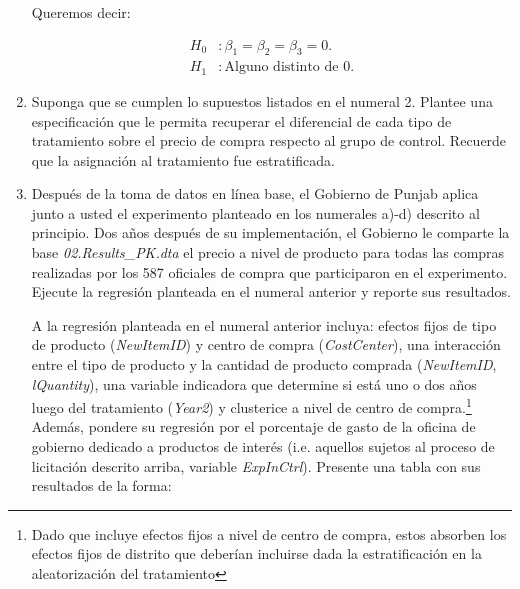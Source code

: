 \documentclass[a4paper, answers, addpoints, 11pt]{exam}
\begin{document}
\begin{enumerate}
\begin{mdframed}
Queremos decir:

\[
\begin{aligned}
H_0 &: \beta_1 = \beta_2 = \beta_3 = 0. \\
H_1 &: \text{Alguno distinto de } 0.
\end{aligned}
\]

        \end{mdframed}
    

   \item Suponga que se cumplen lo supuestos listados en el numeral 2. Plantee una especificación que le permita recuperar el diferencial de cada tipo de tratamiento sobre el precio de compra respecto al grupo de control. Recuerde que la asignación al tratamiento fue estratificada.


   \item Después de la toma de datos en línea base, el Gobierno de Punjab aplica junto a usted el experimento planteado en los numerales a)-d) descrito al principio. Dos años después de su implementación, el Gobierno le comparte la base \textit{02.Results\_PK.dta} el precio a nivel de producto para todas las compras realizadas por los 587 oficiales de compra que participaron en el experimento. Ejecute la regresión planteada en el numeral anterior y reporte sus resultados.
   
   \bigbreak A la regresión planteada en el numeral anterior incluya: efectos fijos de tipo de producto (\textit{NewItemID}) y centro de compra (\textit{CostCenter}), una interacción entre el tipo de producto y la cantidad de producto comprada (\textit{NewItemID}, \textit{lQuantity}), una variable indicadora que determine si está uno o dos años luego del tratamiento (\textit{Year2}) y clusterice a nivel de centro de compra.\footnote{\footnotesize{Dado que incluye efectos fijos a nivel de centro de compra, estos absorben los efectos fijos de distrito que deberían incluirse dada la estratificación en la aleatorización del tratamiento}} Además, pondere su regresión por el porcentaje de gasto de la oficina de gobierno dedicado a productos de interés (i.e. aquellos sujetos al proceso de licitación descrito arriba, variable \textit{ExpInCtrl}). Presente una tabla con sus resultados de la forma:


\end{enumerate}
\end{document}
